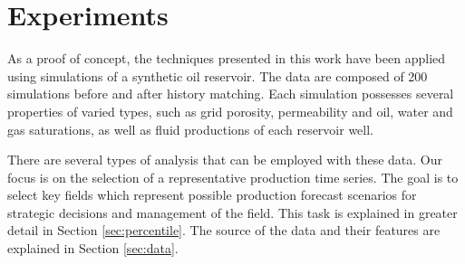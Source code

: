 \documentclass[final,5p,times,twocolumn]{elsarticle}
\begin{document}

%
%
%
%
%


\section{Experiments}
\label{sec:experiments}
As a proof of concept, the techniques presented in this work have been applied using simulations of a synthetic oil reservoir. The data are composed of 200 simulations before and after history matching. Each simulation possesses several properties of varied types, such as grid porosity, permeability and oil, water and gas saturations, as well as fluid productions of each reservoir well.

There are several types of analysis that can be employed with these data. Our focus is on the selection of a representative production time series. The goal is to select key fields which represent possible production forecast scenarios for strategic decisions and management of the field. This task is explained in greater detail in Section \ref{sec:percentile}. The source of the data and their features are explained in Section \ref{sec:data}.
\end{document}

